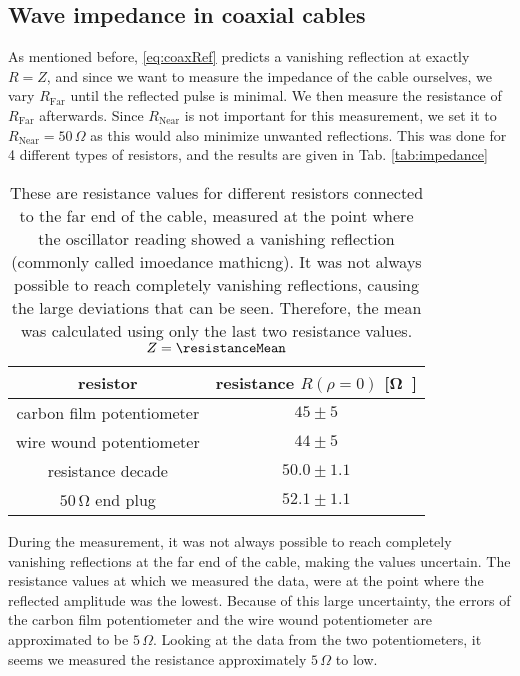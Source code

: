 \documentclass[a4paper,10pt,twocolumn]{article}
\begin{document}
    \subsection{Wave impedance in coaxial cables}
    As mentioned before, \autoref{eq:coaxRef} predicts a vanishing reflection at exactly $R=Z$, and since we want to measure the impedance of the cable ourselves, we vary $R_{\text{Far}}$ until the reflected pulse is minimal.
    We then measure the resistance of $R_{\text{Far}}$ afterwards.
    Since $R_{\text{Near}}$ is not important for this measurement, we set it to $R_{\text{Near}}=50\,\Omega$ as this would also minimize unwanted reflections.
    This was done for 4 different types of resistors, and the results are given in Tab. \autoref{tab:impedance}
    \begin{table}[htbp]          %
        \centering
        \begin{tabular*}{\linewidth}{@{\extracolsep{\fill}}cc}
            \hline
            \hline
            \rule[-7pt]{0pt}{23pt}  resistor  &  resistance $R(\rho=0)$ [\si\ohm]  	 \\
            \hline
            \rule[-5pt]{0pt}{23pt}   carbon film potentiometer   &   $45 \pm 5$  	 \\
            \rule[-5pt]{0pt}{23pt}   wire wound potentiometer   &   $44 \pm 5$  	 \\
            \rule[-5pt]{0pt}{23pt}   resistance decade   &   $50.0 \pm 1.1$  	 \\
            \rule[-5pt]{0pt}{23pt}   $50\,\si\ohm$ end plug   &   $52.1 \pm 1.1$  	 \\
            \hline
            \hline
        \end{tabular*}
        \normalsize
        \caption[]{These are resistance values for different resistors connected to the far end of the cable, measured at the point where the oscillator reading showed a vanishing reflection (commonly called imoedance mathicng).
        It was not always possible to reach completely vanishing reflections, causing the large deviations that can be seen.
        Therefore, the mean was calculated using only the last two resistance values.
        $Z=\resistanceMean $}  %
        \label{tab:impedance}                             %
    \end{table}
    
    During the measurement, it was not always possible to reach completely vanishing reflections at the far end of the cable, making the values uncertain.
    The resistance values at which we measured the data, were at the point where the reflected amplitude was the lowest.
    Because of this large uncertainty, the errors of the carbon film potentiometer and the wire wound potentiometer are approximated to be $5\,\Omega$.
    Looking at the data from the two potentiometers, it seems we measured the resistance approximately $5\,\Omega$ to low.
    
\end{document}
